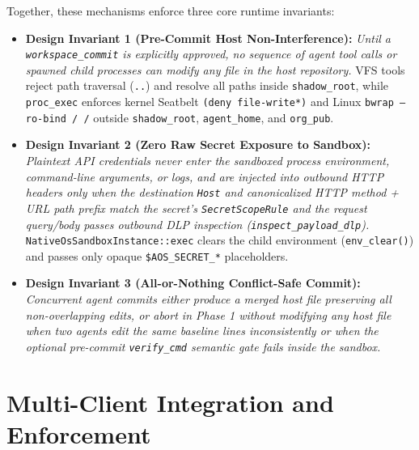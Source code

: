 \documentclass[10pt,twocolumn]{article}
\begin{document}
Together, these mechanisms enforce three core runtime invariants:
\begin{itemize}
    \item \textbf{Design Invariant 1 (Pre-Commit Host Non-Interference):} \emph{Until a \texttt{workspace\_commit} is explicitly approved, no sequence of agent tool calls or spawned child processes can modify any file in the host repository.} VFS tools reject path traversal (\texttt{..}) and resolve all paths inside \texttt{shadow\_root}, while \texttt{proc\_exec} enforces kernel Seatbelt \texttt{(deny file-write*)} and Linux \texttt{bwrap --ro-bind / /} outside \texttt{shadow\_root}, \texttt{agent\_home}, and \texttt{org\_pub}.
    \item \textbf{Design Invariant 2 (Zero Raw Secret Exposure to Sandbox):} \emph{Plaintext API credentials never enter the sandboxed process environment, command-line arguments, or logs, and are injected into outbound HTTP headers only when the destination \texttt{Host} and canonicalized HTTP method + URL path prefix match the secret's \texttt{SecretScopeRule} and the request query/body passes outbound DLP inspection (\texttt{inspect\_payload\_dlp}).} \texttt{NativeOsSandboxInstance::exec} clears the child environment (\texttt{env\_clear()}) and passes only opaque \texttt{\$AOS\_SECRET\_*} placeholders.
    \item \textbf{Design Invariant 3 (All-or-Nothing Conflict-Safe Commit):} \emph{Concurrent agent commits either produce a merged host file preserving all non-overlapping edits, or abort in Phase 1 without modifying any host file when two agents edit the same baseline lines inconsistently or when the optional pre-commit \texttt{verify\_cmd} semantic gate fails inside the sandbox.}
\end{itemize}

\section{Multi-Client Integration and Enforcement}
\label{sec:integration}
\end{document}

